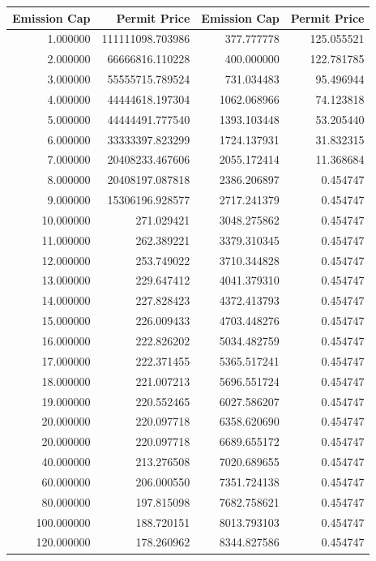 \documentclass[a4paper,twoside,10pt]{article}
\begin{document}
\begin{tabular}{rr|rr}
	\toprule
	Emission Cap & Permit Price & Emission Cap & Permit Price\\
	\midrule
	 1.000000 & 111111098.703986 & 377.777778 & 125.055521 \\
	 2.000000 & 66666816.110228 & 400.000000 & 122.781785 \\
	 3.000000 & 55555715.789524 & 731.034483 & 95.496944 \\
	 4.000000 & 44444618.197304 & 1062.068966 & 74.123818 \\
	 5.000000 & 44444491.777540 & 1393.103448 & 53.205440 \\
	 6.000000 & 33333397.823299 & 1724.137931 & 31.832315 \\
	 7.000000 & 20408233.467606 & 2055.172414 & 11.368684 \\
	 8.000000 & 20408197.087818 & 2386.206897 & 0.454747 \\
	 9.000000 & 15306196.928577 & 2717.241379 & 0.454747 \\
	 10.000000 & 271.029421 & 3048.275862 & 0.454747 \\
	 11.000000 & 262.389221 & 3379.310345 & 0.454747 \\
	 12.000000 & 253.749022 & 3710.344828 & 0.454747 \\
	 13.000000 & 229.647412 & 4041.379310 & 0.454747 \\
	 14.000000 & 227.828423 & 4372.413793 & 0.454747 \\
	 15.000000 & 226.009433 & 4703.448276 & 0.454747 \\
	 16.000000 & 222.826202 & 5034.482759 & 0.454747 \\
	 17.000000 & 222.371455 & 5365.517241 & 0.454747 \\
	 18.000000 & 221.007213 & 5696.551724 & 0.454747 \\
	 19.000000 & 220.552465 & 6027.586207 & 0.454747 \\
	 20.000000 & 220.097718 & 6358.620690 & 0.454747 \\
	 20.000000 & 220.097718 & 6689.655172 & 0.454747 \\
	 40.000000 & 213.276508 & 7020.689655 & 0.454747 \\
	 60.000000 & 206.000550 & 7351.724138 & 0.454747 \\
	 80.000000 & 197.815098 & 7682.758621 & 0.454747 \\
	 100.000000 & 188.720151 & 8013.793103 & 0.454747\\
	 120.000000 & 178.260962 & 8344.827586 & 0.454747 \\

\end{tabular}
\end{document}

